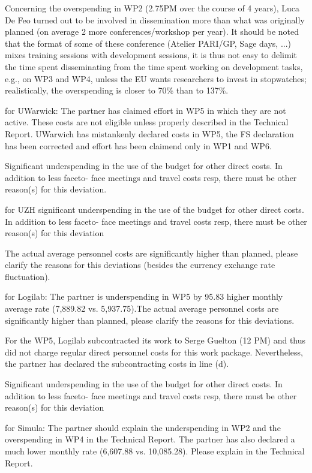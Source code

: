 Concerning the overspending in WP2 (2.75PM over the course of 4
years), Luca De Feo turned out to be involved in dissemination more
than what was originally planned (on average 2 more
conferences/workshop per year). It should be noted that the format of
some of these conference (Atelier PARI/GP, Sage days, ...) mixes
training sessions with development sessions, it is thus not easy to
delimit the time spent disseminating from the time spent working on
development tasks, e.g., on WP3 and WP4, unless the EU wants
researchers to invest in stopwatches; realistically, the overspending
is closer to 70\% than to 137\%.

for UWarwick:
The partner has claimed effort in WP5 in which they are not active. These costs are not eligible
unless properly described in the Technical Report.
UWarwich has mistankenly declared costs in WP5, the FS declaration has been corrected and effort has been claimend only in WP1 and WP6. 

Significant underspending in the use of the budget for other direct costs. In addition to less faceto-
face meetings and travel costs resp, there must be other reason(s) for this deviation.

for UZH
significant underspending in the use of the budget for other direct costs. In addition to less faceto-
face meetings and travel costs resp, there must be other reason(s) for this deviation

The actual average personnel costs are significantly higher than planned, 
please clarify the reasons for this deviations (besides the currency exchange rate fluctuation).

for Logilab:
The partner is underspending in WP5 by 95.83%
higher monthly average rate (7,889.82 vs. 5,937.75).The actual average personnel costs are significantly higher than planned, 
please clarify the reasons for this deviations.

For the WP5, Logilab subcontracted its work to Serge Guelton (12 PM) and thus  did not charge regular direct personnel costs for this work package. Nevertheless, the partner has declared the subcontracting costs in line (d).

Significant underspending in the use of the budget for other direct costs. In addition to less faceto-
face meetings and travel costs resp, there must be other reason(s) for this deviation


for Simula:
The partner should explain the underspending in WP2 and the overspending in WP4 in the
Technical Report. The partner has also declared a much lower monthly rate (6,607.88 vs. 10,085.28). Please explain in the Technical Report.


